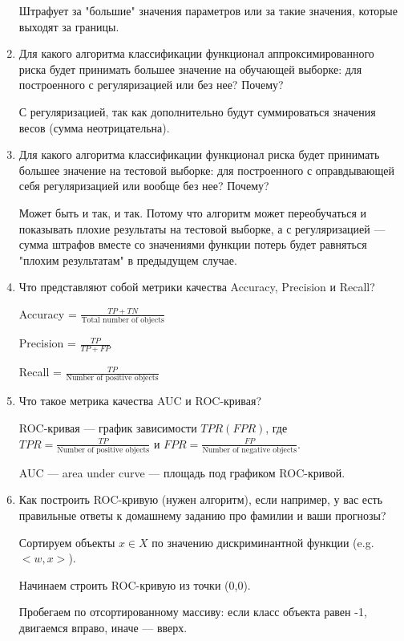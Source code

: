 \documentclass[12pt]{article}
\begin{document}
\begin{enumerate}
			Штрафует за "большие" значения параметров или за такие значения, которые выходят за границы.
		
		\item Для какого алгоритма классификации функционал аппроксимированного риска будет принимать большее значение на обучающей выборке: для построенного с регуляризацией или без нее? Почему?
		
			С регуляризацией, так как дополнительно будут суммироваться значения весов (сумма неотрицательна).
		
		\item Для какого алгоритма классификации функционал риска будет принимать большее значение на тестовой выборке: для построенного с оправдывающей себя регуляризацией или вообще без нее? Почему?
		
			Может быть и так, и так. Потому что алгоритм может переобучаться и показывать плохие результаты на тестовой выборке, а с регуляризацией --- сумма штрафов вместе со значениями функции потерь будет равняться "плохим результатам" в предыдущем случае.
		
		\item Что представляют собой метрики качества Accuracy, Precision и Recall?
		
			Accuracy = $\frac{TP + TN}{\text{Total number of objects}}$
		
			Precision = $\frac{TP}{TP + FP}$
			
			Recall = $\frac{TP}{\text{Number of positive objects}}$
			
		\item Что такое метрика качества AUC и ROC-кривая?

			ROC-кривая --- график зависимости $TPR(FPR)$, где $TPR=\frac{TP}{\text{Number of positive objects}}$ и $FPR=\frac{FP}{\text{Number of negative objects}}$.
			
			AUC --- area under curve --- площадь под графиком ROC-кривой.
			
		\item Как построить ROC-кривую (нужен алгоритм), если например, у вас есть правильные ответы к домашнему заданию про фамилии и ваши прогнозы?
		
			Сортируем объекты $x \in X$ по значению дискриминантной функции (e.g. $<w,x>$).
			
			Начинаем строить ROC-кривую из точки (0,0).
			
			Пробегаем по отсортированному массиву: если класс объекта равен -1, двигаемся вправо, иначе --- вверх.
		
	\end{enumerate}
\end{document}
